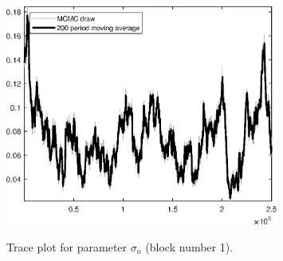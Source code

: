 \begin{figure}[H]
\centering
  \includegraphics[width=0.8\textwidth]{BRS_growth_ext_fd_v1/graphs/TracePlot_sigma_a_blck_1}\\
    \caption{Trace plot for parameter ${\sigma_a}$ (block number 1).}
\end{figure}
